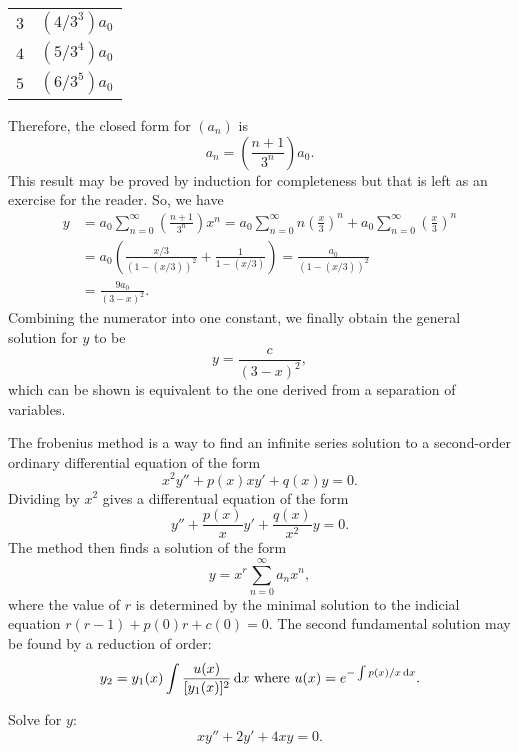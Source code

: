 \begin{soln}
\begin{center}
\begin{tabular}{| c | c |}
            $3$ & $(4/3^3)a_0$ \\
            $4$ & $(5/3^4)a_0$ \\
            $5$ & $(6/3^5)a_0$ \\
            \hline
        \end{tabular}
    \end{center}
    Therefore, the closed form for $(a_n)$ is $$a_n = \left(\frac{n+1}{3^n}\right)a_0.$$ 
    This result may be proved by induction for completeness but that is left
    as an exercise for the reader. So,
    we have 
    \begin{align*}
        y &= a_0\sum_{n = 0}^{\infty} \left(\frac{n+1}{3^n}\right) x^n
          = a_0 \sum_{n = 0}^{\infty} n \left(\frac{x}{3} \right)^n + a_0\sum_{n=0}^{\infty} \left(\frac{x}{3}\right)^n \\
        &= a_0 \left(\frac{x/3}{(1-(x/3))^2}+\frac{1}{1-(x/3)} \right)
        =\frac{a_0}{(1-(x/3))^2} \\
        &= \frac{9a_0}{(3-x)^2}.
    \end{align*}
    Combining the numerator into one constant, we finally obtain the general
    solution for $y$ to be $$y = \frac{c}{(3-x)^2},$$
    which can be shown is equivalent to the one derived from a separation
    of variables.
\end{soln}
\begin{theorem}
    The frobenius method is a way to find an infinite series solution
    to a second-order ordinary differential equation of the form
    $$x^2y'' + p(x)xy' + q(x)y = 0.$$ Dividing by $x^2$ gives a differentual
    equation of the form 
    $$y''+\frac{p(x)}{x}y'+\frac{q(x)}{x^2}y = 0.$$
    The method then finds a solution of the form $$y=x^r\sum_{n=0}^{\infty}a_nx^n,$$
    where the value of $r$ is determined by the
    minimal solution to the \alert{indicial equation} $r(r-1)+p(0)r + c(0) = 0$.
    The second fundamental solution may be found by a reduction of order:
    $$y_2 = y_1(x)\int \frac{u(x)}{[y_1(x)]^2} \dif x ~ \text{where} ~ u(x) = e^{-\int p(x)/x \dif x}.$$
\end{theorem}
\begin{example}
    Solve for $y$:
    $$xy''+2y'+4xy = 0.$$
\end{example}
